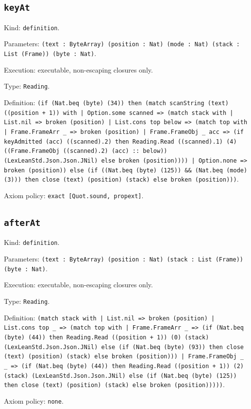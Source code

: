 \documentclass[11pt]{article}
\begin{document}
\subsection*{\texttt{keyAt}}
\noindent Kind: \texttt{definition}.\par
\noindent Parameters: \texttt{(text : ByteArray) (position : Nat) (mode : Nat) (stack : List (Frame)) (byte : Nat)}.\par
\noindent Execution: executable, non-escaping closures only.\par
\noindent Type: \texttt{Reading}.\par
\noindent Definition: \texttt{(if (Nat.beq (byte) (34)) then (match scanString (text) ((position + 1)) with | Option.some scanned => (match stack with | List.nil => broken (position) | List.cons top below => (match top with | Frame.FrameArr \_ => broken (position) | Frame.FrameObj \_ acc => (if keyAdmitted (acc) ((scanned).2) then Reading.Read ((scanned).1) (4) ((Frame.FrameObj ((scanned).2) (acc) :: below)) (LexLeanStd.Json.Json.JNil) else broken (position)))) | Option.none => broken (position)) else (if ((Nat.beq (byte) (125)) \&\& (Nat.beq (mode) (3))) then close (text) (position) (stack) else broken (position)))}.\par
\noindent Axiom policy: \texttt{exact [Quot.sound, propext]}.\par
\subsection*{\texttt{afterAt}}
\noindent Kind: \texttt{definition}.\par
\noindent Parameters: \texttt{(text : ByteArray) (position : Nat) (stack : List (Frame)) (byte : Nat)}.\par
\noindent Execution: executable, non-escaping closures only.\par
\noindent Type: \texttt{Reading}.\par
\noindent Definition: \texttt{(match stack with | List.nil => broken (position) | List.cons top \_ => (match top with | Frame.FrameArr \_ => (if (Nat.beq (byte) (44)) then Reading.Read ((position + 1)) (0) (stack) (LexLeanStd.Json.Json.JNil) else (if (Nat.beq (byte) (93)) then close (text) (position) (stack) else broken (position))) | Frame.FrameObj \_ \_ => (if (Nat.beq (byte) (44)) then Reading.Read ((position + 1)) (2) (stack) (LexLeanStd.Json.Json.JNil) else (if (Nat.beq (byte) (125)) then close (text) (position) (stack) else broken (position)))))}.\par
\noindent Axiom policy: \texttt{none}.\par
\end{document}
